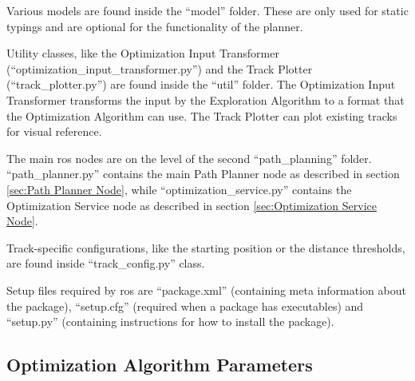 Various models are found inside the ``model'' folder. These are only used for static typings and are optional for the functionality of the planner.

Utility classes, like the Optimization Input Transformer (``optimization\_input\_transformer.py'') and the Track Plotter (``track\_plotter.py'') are found inside the ``util'' folder. The Optimization Input Transformer transforms the input by the Exploration Algorithm to a format that the Optimization Algorithm can use. The Track Plotter can plot existing tracks for visual reference.

The main \acrshort{ros} nodes are on the level of the second ``path\_planning'' folder. ``path\_planner.py'' contains the main Path Planner node as described in section \ref{sec:Path Planner Node}, while ``optimization\_service.py'' contains the Optimization Service node as described in section \ref{sec:Optimization Service Node}.

Track-specific configurations, like the starting position or the distance thresholds, are found inside ``track\_config.py'' class.

Setup files required by \acrshort{ros} are ``package.xml'' (containing meta information about the package), ``setup.cfg'' (required when a package has executables) and ``setup.py'' (containing instructions for how to install the package).

\subsection{Optimization Algorithm Parameters} \label{sec:Appendix Optimization Algorithm Parameters}

